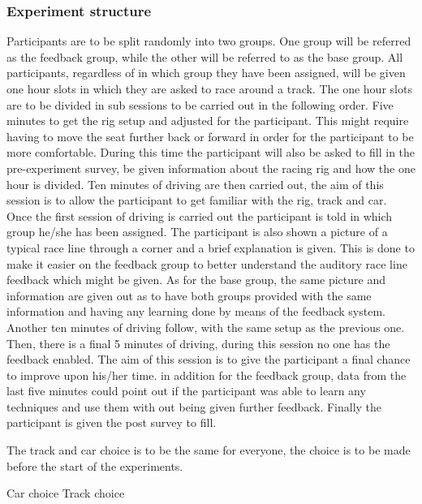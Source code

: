 \subsubsection{Experiment structure}
	Participants are to be split randomly into two groups. One group will be referred as the feedback group, while the other will be referred to as the base group. All participants, regardless of in which group they have been assigned, will be given one hour slots in which they are asked to race around a track. The one hour slots are to be divided in sub sessions to be carried out in the following order. Five minutes to get the rig setup and adjusted for the participant. This might require having to move the seat further back or forward in order for the participant to be more comfortable. During this time the participant will also be asked to fill in the pre-experiment survey, be given information about the racing rig and how the one hour is divided. Ten minutes of driving are then carried out, the aim of this session is to allow the participant to get familiar with the rig, track and car. Once the first session of driving is carried out the participant is told in which group he/she has been assigned. The participant is also shown a picture of a typical race line through a corner and a brief explanation is given. This is done to make it easier on the feedback group to better understand the auditory race line feedback which might be given. As for the base group, the same picture and information are given out as to have both groups provided with the same information and having any learning done by means of the feedback system. Another ten minutes of driving follow, with the same setup as the previous one. Then, there is a final 5 minutes of driving, during this session no one has the feedback enabled. The aim of this session is to give the participant a final chance to improve upon his/her time. in addition for the feedback group, data from the last five minutes could point out if the participant was able to learn any techniques and use them with out being given further feedback. Finally the participant is given the post survey to fill.
		
	The track and car choice is to be the same for everyone, the choice is to be made before the start of the experiments. 
	
	
	Car choice
	Track choice